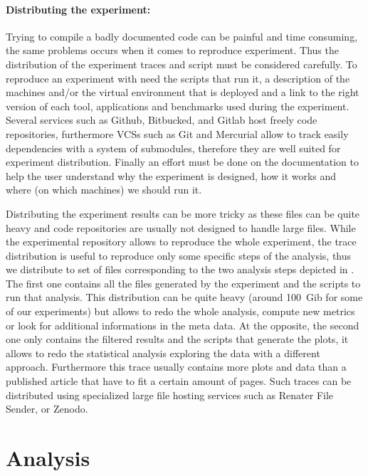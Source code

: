 \paragraph{Distributing the experiment:}

Trying to compile a badly documented code can be painful and time consuming,
the same problems occurs when it comes to reproduce experiment. Thus the
distribution of the experiment traces and script must be considered carefully.
To reproduce an experiment with need the scripts that run it, a description of
the machines and/or the virtual environment that is deployed and a link to the
right version of each tool, applications and benchmarks used during the
experiment. Several services such as Github, Bitbucked, and Gitlab 
host freely code repositories, furthermore \glspl{VCS} such as Git and
Mercurial  allow to track easily dependencies with a system
of submodules, therefore they are well suited for experiment distribution.
Finally an effort must be done on the documentation to help the user
understand why the experiment is designed, how it works and where (on which
machines) we should run it.

Distributing the experiment results can be more tricky as these files can be
quite heavy and code repositories are usually not designed to handle large
files. While the experimental repository allows to reproduce the whole
experiment, the trace distribution is useful to reproduce only some specific
steps of the analysis, thus we distribute to set of files corresponding to the
two analysis steps depicted in . The first one contains all
the files generated by the experiment and the scripts to run that analysis.
This distribution can be quite heavy (around \SI{100}{Gib} for some of our
experiments) but allows to redo the whole analysis, compute new metrics or
look for additional informations in the meta data. At the opposite, the second
one only contains the filtered results and the scripts that generate the
plots, it allows to redo the statistical analysis exploring the data with a
different approach. Furthermore this trace usually contains more plots and
data than a published article that have to fit a certain amount of pages. Such
traces can be distributed using specialized large file hosting services such
as Renater File Sender, or Zenodo.


\section{Analysis}
\label{sec:sofa}

